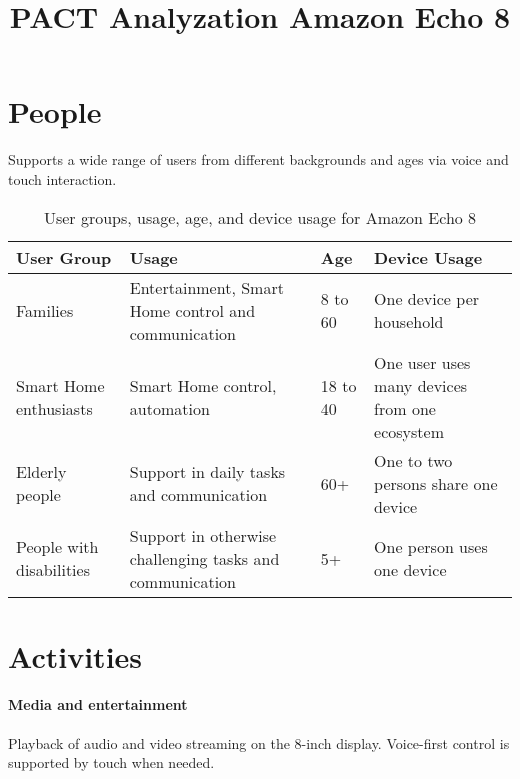 \documentclass[a4paper,10pt]{article}
\begin{document}
    \kopf
    \renewcommand{\figurename}{Figure}

    \title{PACT Analyzation Amazon Echo 8}


    \section{People}\label{sec:people}
    Supports a wide range of users from different backgrounds and ages via voice and touch interaction.

    \begin{table}[htbp]
        \centering
        \begin{tabularx}{\textwidth}{|l|X|l|X|}
            \hline
            \textbf{User Group}      & \textbf{Usage}                                           & \textbf{Age} & \textbf{Device Usage}                         \\
            \hline
            Families                 & Entertainment, Smart Home control and communication      & 8 to 60      & One device per household                      \\
            \hline
            Smart Home enthusiasts   & Smart Home control, automation                           & 18 to 40     & One user uses many devices from one ecosystem \\
            \hline
            Elderly people           & Support in daily tasks and communication                 & 60+          & One to two persons share one device           \\
            \hline
            People with disabilities & Support in otherwise challenging tasks and communication & 5+           & One person uses one device \\
            \hline
        \end{tabularx}
        \caption{User groups, usage, age, and device usage for Amazon Echo 8}
        \label{tab:user-groups}
    \end{table}


    \section{Activities}\label{sec:activities}

    \paragraph{Media and entertainment}
    Playback of audio and video streaming on the 8-inch display.
    Voice-first control is supported by touch when needed.
\end{document}
